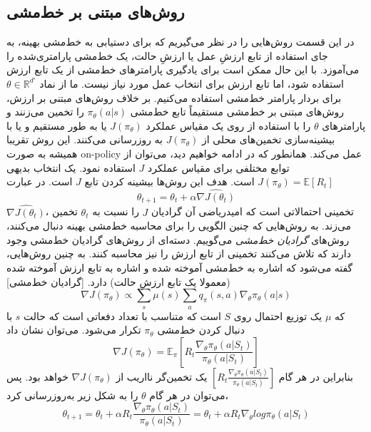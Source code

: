 \subsection{روش‌های مبتنی بر خط‌مشی}
در این قسمت روش‌هایی را در نظر می‌گیریم که برای دستیابی به خط‌مشی بهینه، به جای استفاده از تابع ارزشِ عمل یا ارزشِ حالت، یک خط‌مشی پارامتری‌شده 
 را می‌آموزد. با این حال ممکن است برای یادگیری پارامترهای خط‌مشی از یک تابع ارزش استفاده شود، اما تابع ارزش برای انتخاب عمل مورد نیاز نیست. ما از نماد
$\theta \in \mathbb{R}^{d'}$ برای بردار پارامتر خط‌مشی استفاده می‌کنیم.
بر خلاف روش‌های مبتنی بر ارزش، روش‌های مبتنی بر خط‌مشی مستقیماً تابع خط‌مشی 
$\pi_\theta(a|s)$
 را تخمین می‌زنند و پارامترهای $\theta$ را با استفاده از 
  روی یک مقیاس عملکرد  
 $J(\pi_\theta)$ یا به طور مستقیم و یا با بیشینه‌سازی تخمین‌های محلی از  $J(\pi_\theta)$ به روزرسانی می‌کنند.
  این روش تقریبا همیشه به صورت on-policy  عمل می‌کند. 
همانطور که در ادامه خواهیم دید، می‌توان از توابع مختلفی برای مقیاس عملکرد $J$ استفاده نمود. یک انتخاب بدیهی 
$J(\pi_\theta) = \mathbb{E}[R_t]$
است. هدف این روش‌ها بیشینه کردن تابع $J$ است. در عبارت 
$$\theta_{t+1}=\theta_t + \alpha \hat{\nabla J(\theta_t)}$$
$\hat{\nabla J(\theta_t)}$،
تخمینی احتمالاتی است که امیدریاضی آن گرادیان  $J$ را نسبت به $\theta_t$ تخمین می‌زند.
به روش‌هایی که چنین الگویی را برای محاسبه خط‌مشی بهینه دنبال می‌کنند، روش‌های \textit{گرادیان خط‌مشی } می‌گوییم. دسته‌ای از روش‌های گرادیان خط‌مشی وجود دارند که تلاش می‌کنند تخمینی از تابع ارزش را نیز محاسبه کنند. به چنین روش‌هایی، \textit{} 
 گفته می‌شود که \textit{} 
  اشاره به خط‌مشی آموخته شده و \textit{} 
   اشاره به تابع ارزش آموخته شده (معمولا یک تابع ارزشِ حالت) دارد.
[گرادیان خط‌مشی]
$$\nabla J(\pi_\theta) \propto \sum_{s} \mu(s) \sum_{a} q_\pi(s,a) \nabla_\theta \pi_\theta(a|s)$$
که $\mu$ یک توزیع احتمال روی $S$ است که متناسب با تعداد دفعاتی است که حالت $s$ با دنبال کردن خط‌مشی 
$\pi_\theta$
 تکرار می‌شود.
می‌توان نشان داد 
$$\nabla J(\pi_\theta) = \mathbb{E}_\pi \left[ R_t \frac{\nabla_\theta \pi_\theta (a|S_t)}{\pi_\theta (a|S_t)} \right]$$
بنابراین در هر گام
$\left[ R_t \frac{\nabla_\theta \pi_\theta (a|S_t)}{\pi_\theta (a|S_t)} \right]$
یک تخمین‌گر نااریب از $\nabla J(\pi_\theta)$ خواهد بود\cite{suttonbook}. پس می‌توان در هر گام $\theta$ را به شکل زیر به‌روزرسانی کرد،
$$\theta_{t+1} = \theta_t + \alpha R_t \frac{\nabla_\theta \pi_\theta (a|S_t)}{\pi_\theta (a|S_t)} = \theta_t + \alpha R_t \nabla_\theta log \pi_\theta (a|S_t)$$

